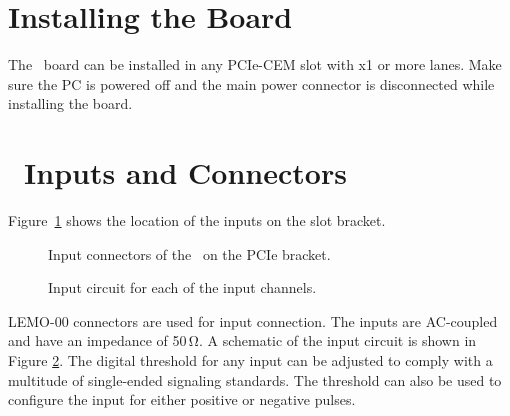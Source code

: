 \label{sec:installation-of-board}
\section{Installing the Board}
The \deviceName\ board can be installed in any PCIe-CEM slot with x1 or more
lanes.  Make sure the PC is powered off and the main power connector is
disconnected while installing the board.\par

%
\section{\deviceName\ Inputs and Connectors}
    Figure~\ref{fig:bracket} shows the location of the inputs on the slot
    bracket.  %
    \begin{figure}[hb]
        \begin{center}
            \caption{
                Input connectors of the \deviceName\ on the PCIe
                bracket.%
                \label{fig:bracket}
            }
        \end{center}
    \end{figure}
    \begin{figure}[hb]
        \begin{center}
            \caption{
                Input circuit for each of the input
                channels.
                \label{fig:inputcirc}
            }
        \end{center}
    \end{figure}

    LEMO-00 connectors are used for input connection. The inputs are AC-coupled
    and have an impedance of 50\,Ω.  A schematic of the input circuit is shown
    in Figure \ref{fig:inputcirc}.  The digital threshold for any input can be
    adjusted to comply with a multitude of single-ended signaling standards. 
    The threshold can also be used to configure the input for either positive
    or negative pulses.
    
